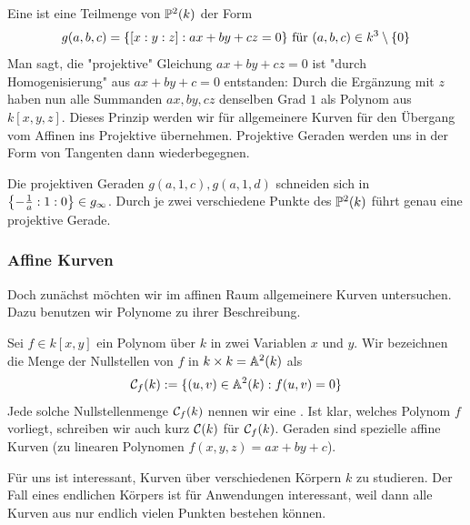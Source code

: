 \begin{defn}
	Eine  ist eine Teilmenge von $\PP^2(k)$ der Form
	\[ g(a,b,c) = \{ [x:y:z] : ax+by+cz = 0\} \text{ für } (a,b,c) \in k^3 \setminus \setnull \]
	Man sagt, die "projektive" Gleichung $ax+by+cz = 0$ ist "durch Homogenisierung" aus $ax+by+c = 0$ entstanden: Durch die Ergänzung mit $z$ haben nun alle Summanden $ax,by,cz$ denselben Grad $1$ als Polynom aus $k[x,y,z]$. Dieses Prinzip werden wir für allgemeinere Kurven für den Übergang vom Affinen ins Projektive übernehmen. Projektive Geraden werden uns in der Form von Tangenten dann wiederbegegnen.
\end{defn}

	Die projektiven Geraden $g(a,1,c),g(a,1,d)$ schneiden sich in $\penbrace*{-\frac{1}{a}:1:0} \in g_\infty$. Durch je zwei verschiedene Punkte des $\PP^2(k)$ führt genau eine projektive Gerade.
	
\subsubsection{Affine Kurven}
\label{subsub:2.2.2}
	Doch zunächst möchten wir im affinen Raum allgemeinere Kurven untersuchen. Dazu benutzen wir Polynome zu ihrer Beschreibung.
	
\begin{defn}
	Sei $f \in k[x,y]$ ein Polynom über $k$ in zwei Variablen $x$ und $y$. Wir bezeichnen die Menge der Nullstellen von $f$ in $k \times k = \aff^2(k)$ als
	\[ \cc_f(k) := \{(u,v) \in \aff^2(k) : f(u,v) = 0\}\]
	Jede solche Nullstellenmenge $\cc_f(k)$ nennen wir eine . Ist klar, welches Polynom $f$ vorliegt, schreiben wir auch kurz $\cc(k)$ für $\cc_f(k)$. Geraden sind spezielle affine Kurven (zu linearen Polynomen $f(x,y,z) = ax+by+c$).
\end{defn}

\begin{bem}
	Für uns ist interessant, Kurven über verschiedenen Körpern $k$ zu studieren. Der Fall eines endlichen Körpers ist für Anwendungen interessant, weil dann alle Kurven aus nur endlich vielen Punkten bestehen können.
\end{bem}

